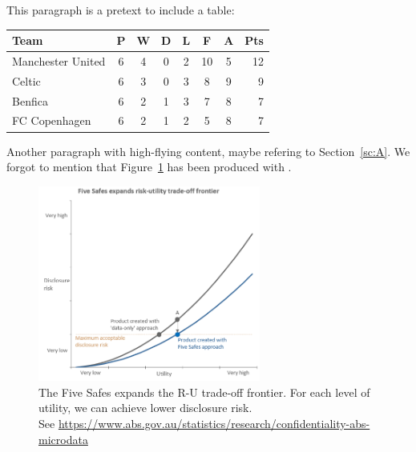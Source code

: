 \documentclass[a4paper,11pt]{template/style/uneceart}
\begin{document}
This paragraph is a pretext to include a table:

\begin{tabular}{l*{6}{c}r}
Team              & P & W & D & L & F  & A & Pts \\
\hline
Manchester United & 6 & 4 & 0 & 2 & 10 & 5 & 12  \\
Celtic            & 6 & 3 & 0 & 3 &  8 & 9 &  9  \\
Benfica           & 6 & 2 & 1 & 3 &  7 & 8 &  7  \\
FC Copenhagen     & 6 & 2 & 1 & 2 &  5 & 8 &  7  \\
\end{tabular}


Another paragraph with high-flying content, maybe refering to
Section~\ref{sc:A}. We forgot to mention that
Figure~\ref{plot:1}  has been produced with \R .

\begin{figure}[ht]
\begin{center}
\includegraphics[width=0.65\textwidth]{template/figures/RU-5safes.png}
\caption{\label{plot:1}The Five Safes expands the R-U trade-off frontier. For each level of utility, we can achieve lower disclosure risk.\\
See \small{\url{https://www.abs.gov.au/statistics/research/confidentiality-abs-microdata}}}
\end{center}
\end{figure}



\end{document}
